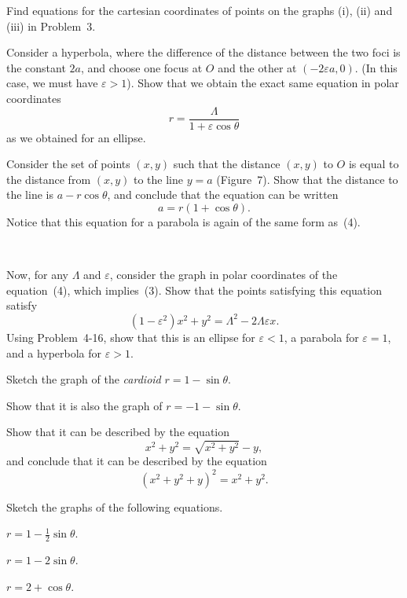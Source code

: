  Find equations for the cartesian coordinates of points on the graphs
(i), (ii) and (iii) in Problem~3.

 Consider a hyperbola, where the difference of the distance between
the two foci is the constant $2a$, and choose one focus at $O$ and the other at
$(-2\varepsilon a,0)$. (In this case, we must have $\varepsilon>1$). Show that
we obtain the exact same equation in polar coordinates
\[
r=\frac{\Lambda}{1+\varepsilon\cos\theta}
\]
as we obtained for an ellipse.

 Consider the set of points $(x,y)$ such that the distance $(x,y)$ to
$O$ is equal to the distance from $(x,y)$ to the line $y=a$ (Figure~7). Show
that the distance to the line is $a-r\cos\theta$, and conclude that the
equation can be written
\[
a=r(1+\cos\theta).
\]
Notice that this equation for a parabola is again of the same form as~(4).

\begin{center}
\\[0.6em]
\end{center}

 Now, for any $\Lambda$ and $\varepsilon$, consider the graph in polar
coordinates of the equation~(4), which implies~(3). Show that the points
satisfying this equation satisfy
\[
(1-\varepsilon^2)x^2+y^2=\Lambda^2-2\Lambda\varepsilon x.
\]
Using Problem~4-16, show that this is an ellipse for $\varepsilon<1$, a
parabola for $\varepsilon=1$, and a hyperbola for $\varepsilon>1$.

\begin{letters}
\item Sketch the graph of the \emph{cardioid} $r=1-\sin\theta$.
\item Show that it is also the graph of $r=-1-\sin\theta$.
\item Show that it can be described by the equation
  \[
  x^2+y^2=\sqrt{x^2+y^2}-y,
  \]
  and conclude that it can be described by the equation
  \[
  (x^2+y^2+y)^2=x^2+y^2.
  \]
\end{letters}

 Sketch the graphs of the following equations.
\begin{romans}
\item $r=1-\frac12\sin\theta$.
\item $r=1-2\sin\theta$.
\item $r=2+\cos\theta$.
\end{romans}

